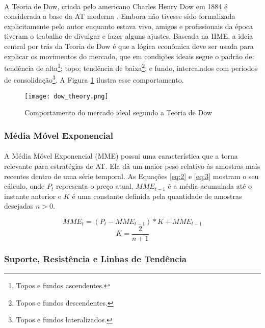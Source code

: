 \paragraph{} A Teoria de Dow, criada pelo americano Charles Henry Dow em 1884 é considerada a base da AT moderna \cite{kirkpatrick2010technical}. Embora não tivesse sido formalizada explicitamente pelo autor enquanto estava vivo, amigos e profissionais da época tiveram o trabalho de divulgar e fazer alguns ajustes. Baseada na HME, a ideia central por trás da Teoria de Dow é que a lógica econômica deve ser usada para explicar os movimentos do mercado, que em condições ideais segue o padrão de: tendência de alta\footnote{Topos e fundos ascendentes.}; topo; tendência de baixa\footnote{Topos e fundos descendentes.}; e fundo, intercalados com períodos de consolidação\footnote{Topos e fundos lateralizados.}. A Figura \ref{fig:2} ilustra esse comportamento.

\begin{figure}[h]
    \texttt{[image: dow\_theory.png]}
    \centering
    \caption{Comportamento do mercado ideal segundo a Teoria de Dow \cite{kirkpatrick2010technical}}
    \label{fig:2}
\end{figure}

\subsubsection*{Média Móvel Exponencial}

\paragraph{} A Média Móvel Exponencial (MME) possui uma característica que a torna relevante para estratégias de AT. Ela dá um maior peso relativo às amostras mais recentes dentro de uma série temporal. As Equações \ref{eq:2} e \ref{eq:3} mostram o seu cálculo, onde $P_t$ representa o preço atual, $\mathit{MME_{t-1}}$ é a média acumulada até o instante anterior e $K$ é uma constante definida pela quantidade de amostras desejadas $n>0$.

\begin{equation} \label{eq:2}
    \mathit{MME_t} = (P_t - \mathit{MME_{t-1}}) * K + \mathit{MME_{t-1}}
\end{equation}
\begin{equation} \label{eq:3}
    K = \frac{2}{n+1}
\end{equation}

\subsubsection*{Suporte, Resistência e Linhas de Tendência}

